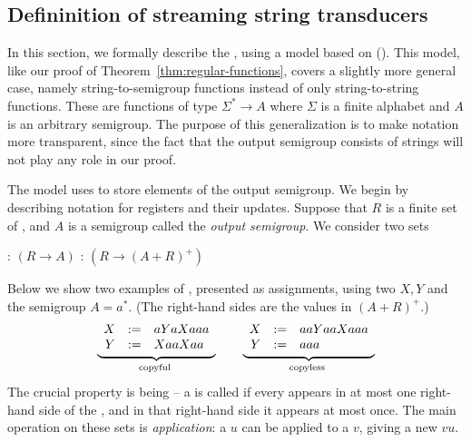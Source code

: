 \subsection{Defininition of streaming string transducers}
\label{sec:sst-definition}
In this section, we formally describe the , using a model based on  (\sst).  This model, like our proof of Theorem~\ref{thm:regular-functions}, covers a slightly more general case, namely string-to-semigroup functions instead of only string-to-string functions. These are functions of type $\Sigma^* \to A$ where $\Sigma$ is a finite alphabet and $A$ is an arbitrary semigroup.  The purpose of this generalization is to make notation more transparent, since the fact that the output semigroup consists of strings will not play any role in our proof.

\AP The model uses  to store elements of the output semigroup. We begin by describing notation for registers and their updates. Suppose that $R$ is a finite set of , and $A$ is a semigroup called the \emph{output semigroup}. We consider two sets 
\begin{center}
    : $(R \to A)$
  \qquad
    : $(R \to (A+R)^+)$
\end{center}
Below we show two examples of , presented as assignments, using two  $X,Y$ and the semigroup $A = a^*$. (The right-hand sides are the values in $(A+R)^+$.)
\begin{align*}
    \myunderbrace{
    \begin{array}{rcl}
        X &:=& aYaXaaa\\
    Y &:=& XaaXaa
    \end{array}
    }{copyful}
    \qquad 
    \myunderbrace{
    \begin{array}{rcl}
        X &:=& aaYaaXaaa\\
    Y &:=& aaa
    \end{array}
    }{copyless}
    \end{align*}
\AP The crucial property is being  -- a  is called  if every  appears in at most one right-hand side of the , and in that right-hand side it appears at most once. 
The main operation on these sets is \emph{application}: a  $u$
can be applied to a  $v$, giving a new  $vu$. 


